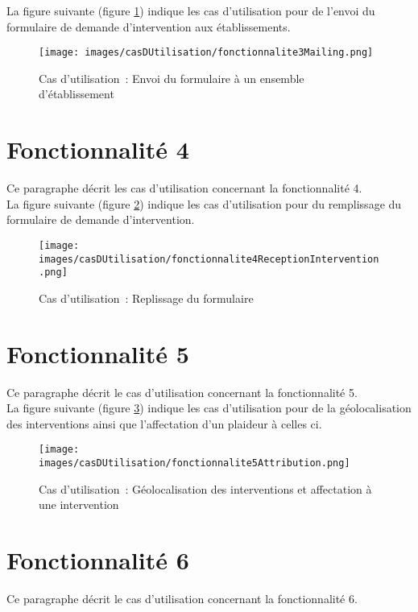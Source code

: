 La figure suivante (figure \ref{diagrammeCasUtilisation3}) indique les cas d'utilisation pour de l'envoi du formulaire de demande d'intervention aux établissements.
\begin{figure}[H]
	\centering
	\texttt{[image: images/casDUtilisation/fonctionnalite3Mailing.png]}
	\caption{Cas d'utilisation~: Envoi du formulaire à un ensemble d'établissement}
	\label{diagrammeCasUtilisation3}
\end{figure}

\section{Fonctionnalité 4}
Ce paragraphe décrit les cas d'utilisation concernant la fonctionnalité 4. \\

La figure suivante (figure \ref{diagrammeCasUtilisation4}) indique les cas d'utilisation pour du remplissage du formulaire de demande d'intervention.
\begin{figure}[H]
	\centering
	\texttt{[image: images/casDUtilisation/fonctionnalite4ReceptionIntervention.png]}
	\caption{Cas d'utilisation~: Replissage du formulaire}
	\label{diagrammeCasUtilisation4}
\end{figure}

\section{Fonctionnalité 5}
Ce paragraphe décrit le cas d'utilisation concernant la fonctionnalité 5. \\

La figure suivante (figure \ref{diagrammeCasUtilisation5}) indique les cas d'utilisation pour de la géolocalisation des interventions ainsi que l'affectation d'un plaideur à celles ci. \\
\begin{figure}[H]
	\centering
	\texttt{[image: images/casDUtilisation/fonctionnalite5Attribution.png]}
	\caption{Cas d'utilisation~: Géolocalisation des interventions et affectation à une intervention}
	\label{diagrammeCasUtilisation5}
\end{figure}

\section{Fonctionnalité 6}
Ce paragraphe décrit le cas d'utilisation concernant la fonctionnalité 6. \\

